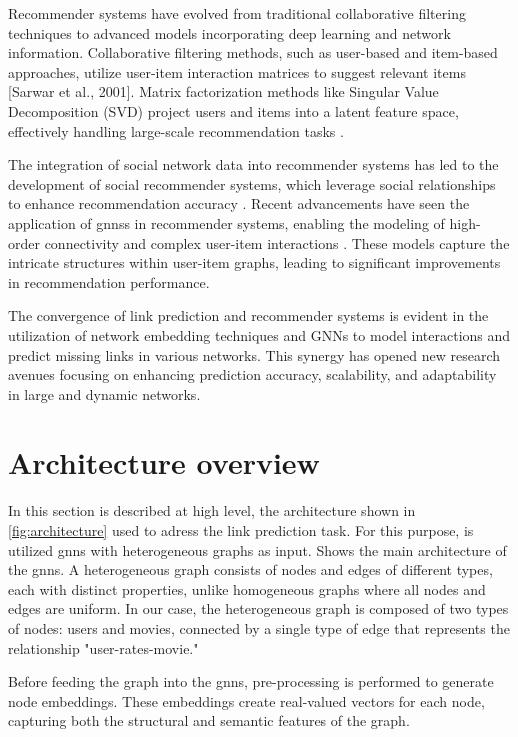 \documentclass[11pt]{article}
\begin{document}
Recommender systems have evolved from traditional collaborative filtering techniques to advanced models 
incorporating deep learning and network information. Collaborative filtering methods, such as user-based 
and item-based approaches, utilize user-item interaction matrices to suggest relevant items [Sarwar et al., 2001]. 
Matrix factorization methods like Singular Value Decomposition (SVD) project users and items into a latent feature 
space, effectively handling large-scale recommendation tasks \cite{sarwar2001item}.

The integration of social network data into recommender systems has led to the development of social recommender 
systems, which leverage social relationships to enhance recommendation accuracy \cite{jamali2010matrix}. 
Recent advancements have seen the application of \acp{gnn}s in recommender systems, enabling the modeling of high-order 
connectivity and complex user-item interactions \cite{wang2019neural}. These models capture the intricate structures 
within user-item graphs, leading to significant improvements in recommendation performance.

The convergence of link prediction and recommender systems is evident in the utilization of network embedding 
techniques and GNNs to model interactions and predict missing links in various networks. This synergy has opened new 
research avenues focusing on enhancing prediction accuracy, scalability, and adaptability in large and dynamic networks.

\section{Architecture overview}\label{sec:architecture-overview}
In this section is described at high level, the architecture shown in \ref{fig:architecture} used to adress 
the link prediction task. 
For this purpose, is utilized \acp{gnn} with heterogeneous graphs 
as input.  Shows the main architecture of the \acp{gnn}. 
A heterogeneous graph consists of nodes and edges of different types, 
each with distinct properties, unlike homogeneous graphs where all nodes and edges are 
uniform. In our case, the heterogeneous graph is composed of two types of nodes: 
users and movies, connected by a single type of edge that represents the relationship "user-rates-movie."

Before feeding the graph into the \acp{gnn}, pre-processing is performed to 
generate node embeddings. These embeddings create real-valued vectors for each node, 
capturing both the structural and semantic features of the graph.
\end{document}
